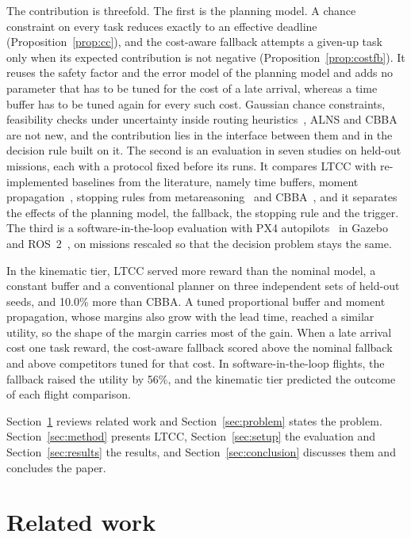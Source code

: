 \documentclass[a4paper,fleqn]{cas-dc}
\newcommand{\mname}{LTCC}  %
\newcounter{prop}
\begin{document}
The contribution is threefold. The first is the planning model. A chance constraint on every task reduces exactly to an
effective deadline (Proposition~\ref{prop:cc}), and the cost-aware fallback attempts a given-up task only when its
expected contribution is not negative (Proposition~\ref{prop:costfb}). It reuses the safety factor and the error model
of the planning model and adds no parameter that has to be tuned for the cost of a late arrival, whereas a time buffer
has to be tuned again for every such cost. Gaussian chance
constraints, feasibility checks under uncertainty inside routing
heuristics~\cite{ehmke2015ensuring,bomboi2022stochastic}, ALNS and CBBA are not new, and the contribution lies in the
interface between them and in the decision rule built on it. The second is an evaluation in seven studies on held-out missions, each with a protocol fixed before
its runs. It compares \mname{} with re-implemented baselines from the literature, namely time buffers, moment
propagation~\cite{ehmke2015ensuring}, stopping rules from
metareasoning~\cite{boddy1994deliberation,zilberstein1996using,svegliato2018meta} and CBBA~\cite{choi2009consensus}, and
it separates the effects of the planning model, the fallback, the stopping rule and the trigger. The third is a
software-in-the-loop evaluation with PX4 autopilots~\cite{meier2015px4} in Gazebo~\cite{koenig2004gazebo} and
ROS~2~\cite{macenski2022ros2}, on missions rescaled so that the decision problem stays the same.

In the kinematic tier, \mname{} served more reward than the nominal model, a constant buffer and a conventional planner
on three independent sets of held-out seeds, and 10.0\% more than CBBA. A tuned proportional buffer and
moment propagation, whose margins also grow with the lead time, reached a similar utility, so the shape of the margin
carries most of the gain. When a late arrival cost one task reward, the cost-aware fallback scored above the nominal
fallback and above competitors tuned for that cost. In software-in-the-loop flights, the fallback raised the utility by
56\%, and the kinematic tier predicted the outcome of each flight comparison.

Section~\ref{sec:related} reviews related work and Section~\ref{sec:problem} states the problem.
Section~\ref{sec:method} presents \mname{}, Section~\ref{sec:setup} the evaluation and Section~\ref{sec:results} the
results, and Section~\ref{sec:conclusion} discusses them and concludes the paper.

\section{Related work}\label{sec:related}
\end{document}
